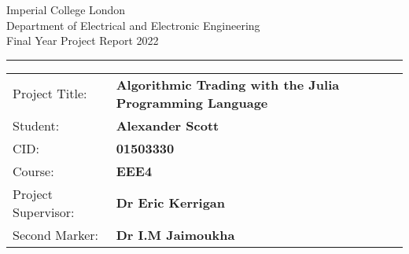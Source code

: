 \begin{titlepage}
                \setlength{\parindent}{0pt}
                \setlength{\parskip}{0pt}

                {
                                \Large
                                \raggedright
                                Imperial College London\\[17pt]
                                Department of Electrical and Electronic Engineering\\[17pt]
                                Final Year Project Report 2022\\[17pt]
 
                }

                \rule{\columnwidth}{3pt}
                \vfill
                \centering
                \vfill
                \setlength{\tabcolsep}{0pt}

                \begin{tabular}{p{40mm}p{\dimexpr\columnwidth-40mm}}
                                Project Title: & \textbf{Algorithmic Trading with the Julia Programming Language} \\[12pt]
                                Student: & \textbf{Alexander Scott} \\[12pt]
                                CID: & \textbf{01503330} \\[12pt]
                                Course: & \textbf{EEE4} \\[12pt]
                                Project Supervisor: & \textbf{Dr Eric Kerrigan} \\[12pt]
                                Second Marker: & \textbf{Dr I.M Jaimoukha} \\
                \end{tabular}
\end{titlepage}